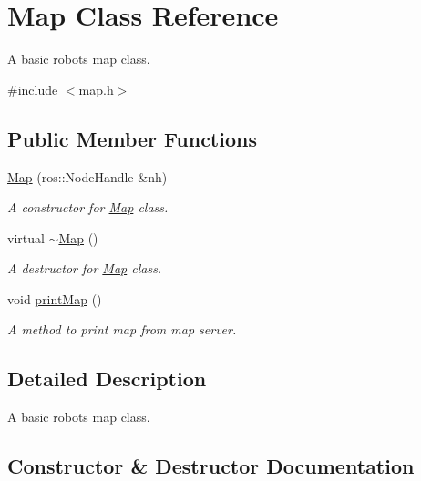 \hypertarget{classMap}{}\section{Map Class Reference}
\label{classMap}


A basic robot\textquotesingle{}s map class.  




{\ttfamily \#include $<$map.\+h$>$}

\subsection*{Public Member Functions}
\begin{DoxyCompactItemize}
\item 
\hyperlink{classMap_a12306af718f86c34dad3873a67d64280}{Map} (ros\+::\+Node\+Handle \&nh)
\begin{DoxyCompactList}\small\item\em A constructor for \hyperlink{classMap}{Map} class. \end{DoxyCompactList}\item 
\mbox{\label{classMap_ac1ab46138aa61acd0a58b1fd21e0df37}} 
virtual \hyperlink{classMap_ac1ab46138aa61acd0a58b1fd21e0df37}{$\sim$\+Map} ()
\begin{DoxyCompactList}\small\item\em A destructor for \hyperlink{classMap}{Map} class. \end{DoxyCompactList}\item 
\mbox{\label{classMap_a1cefc1b8ed6692667e2019f64acc0f5a}} 
void \hyperlink{classMap_a1cefc1b8ed6692667e2019f64acc0f5a}{print\+Map} ()
\begin{DoxyCompactList}\small\item\em A method to print map from map server. \end{DoxyCompactList}\end{DoxyCompactItemize}


\subsection{Detailed Description}
A basic robot\textquotesingle{}s map class. 

\subsection{Constructor \& Destructor Documentation}
\mbox{\label{classMap_a12306af718f86c34dad3873a67d64280}} 
